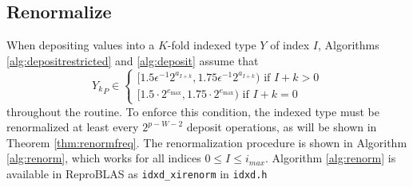 \subsection{Renormalize}
    \label{sec:primitiveops_renormalize}
    When depositing values into a $K$-fold indexed type $Y$ of index $I$,
    Algorithms \ref{alg:depositrestricted} and \ref{alg:deposit}
    assume that 
    \[
      {Y_k}_P \in \begin{cases}[1.5  \epsilon^{-1} 2^{a_{I + k}}, 1.75  \epsilon^{-1} 2^{a_{I + k}}) \text{ if } I + k > 0 \\ [1.5 \cdot 2^{e_{\max}}, 1.75 \cdot 2^{e_{\max}}) \text{ if } I + k = 0\end{cases}
    \] 
    throughout the routine.
    To enforce this condition, the indexed type must be renormalized at least
    every $2^{p-W-2}$ deposit operations, as will be shown in Theorem \ref{thm:renormfreq}.
    The renormalization procedure is shown in Algorithm \ref{alg:renorm},
    which works for all indices $0 \leq I \leq i_{max}$. Algorithm \ref{alg:renorm} is available in ReproBLAS as \texttt{idxd\_xirenorm} in \texttt{idxd.h}

